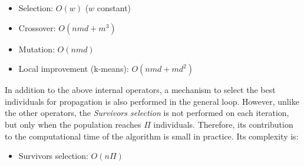 

\begin{itemize}

	\item Selection: $O(w)$ ($w$ constant)

	\item Crossover: $O(nmd + m^{3})$

	\item Mutation: $O(nmd)$

	\item Local improvement (k-means): $O(nmd + md^2)$

\end{itemize}


In addition to the above internal operators, a mechanism to select the best individuals for propagation is also performed in the general loop. However, unlike the other operators, the \textit{Survivors selection} is not performed on each iteration, but only when the population reaches $\Pi$ individuals. Therefore, its contribution to the computational time of the algorithm is small in practice. Its complexity is:

\begin{itemize}

	\item Survivors selection: $O(n\Pi)$


\end{itemize}